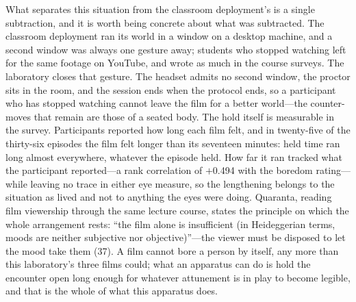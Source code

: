 What separates this situation from the classroom deployment's is a single subtraction, and it
is worth being concrete about what was subtracted. The classroom deployment ran its world in a
window on a desktop machine, and a second window was always one gesture away; students who
stopped watching left for the same footage on YouTube, and wrote as much in the course surveys.
The laboratory closes that gesture. The headset admits no second window, the proctor sits in
the room, and the session ends when the protocol ends, so a participant who has stopped
watching cannot leave the film for a better world---the counter-moves that remain are those of
a seated body. The hold itself is measurable in the survey. Participants reported how long each
film felt, and in twenty-five of the thirty-six episodes the film felt longer than its
seventeen minutes: held time ran long almost everywhere, whatever the episode held. How far it
ran tracked what the participant reported---a rank correlation of $+$0.494 with the boredom
rating---while leaving no trace in either eye measure, so the lengthening belongs to the
situation as lived and not to anything the eyes were doing. Quaranta, reading film viewership
through the same lecture course, states the principle on which the whole arrangement rests:
``the film alone is insufficient (in Heideggerian terms, moods are neither subjective nor
objective)''---the viewer must be disposed to let the mood take them (37). A film cannot bore a
person by itself, any more than this laboratory's three films could; what an apparatus can do
is hold the encounter open long enough for whatever attunement is in play to become legible,
and that is the whole of what this apparatus does.


